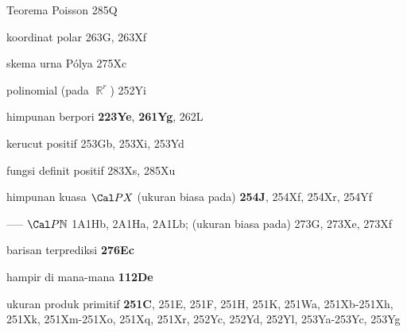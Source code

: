 Teorema Poisson 285Q




koordinat polar 263G, 263Xf









skema urna P\'olya 275Xc


polinomial (pada $\BbbR^r$) 252Yi








himpunan berpori {\bf 223Ye}, {\bf 261Yg}, 262L


kerucut positif 253Gb, 253Xi, 253Yd


fungsi definit positif 283Xs, 285Xu













himpunan kuasa $\Cal PX$
  (ukuran biasa pada) {\bf 254J}, 254Xf, 254Xr, 254Yf




{----- $\Cal P\Bbb N$ }
1A1Hb,
  2A1Ha, 2A1Lb;  
  (ukuran biasa pada)  273G, 273Xe, 273Xf
  



















barisan terprediksi {\bf 276Ec}







hampir di mana-mana {\bf 112De}




ukuran produk primitif {\bf 251C}, 251E, 251F, 251H, 251K, 251Wa,
251Xb-251Xh, 
251Xk, 251Xm-251Xo, 
251Xq, 251Xr, 252Yc, 252Yd, 252Yl, 253Ya-253Yc, 
253Yg








